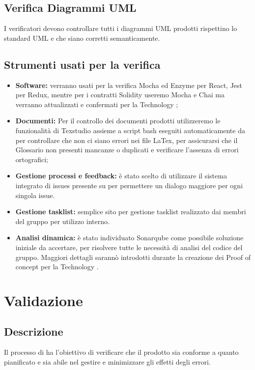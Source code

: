 \documentclass[NormeDiProgetto.tex]{subfiles}
\begin{document}
	\subsection{Verifica Diagrammi UML}
	I verificatori devono controllare tutti i diagrammi UML prodotti rispettino lo standard UML e che siano corretti semanticamente.
	
	\subsection{Strumenti usati per la verifica}
	\begin{itemize}
		\item \textbf{Software:} verranno usati per la verifica Mocha ed Enzyme per React, Jest per Redux, mentre per i contratti Solidity useremo Mocha e Chai ma verranno attualizzati e confermati per la Technology ;
		\item \textbf{Documenti:} Per il controllo dei documenti prodotti utilizzeremo le funzionalità di Texstudio assieme a script bash eseguiti automaticamente da  per controllare che non ci siano errori nei file LaTex, per assicurarsi che il Glossario non presenti mancanze o duplicati e verificare l'assenza di errori ortografici;
		\item \textbf{Gestione processi e feedback:} è stato scelto di utilizzare il sistema integrato di issues presente su  per permettere un dialogo maggiore per ogni singola issue. 
		\item \textbf{Gestione tasklist:}  semplice sito per gestione tasklist realizzato dai membri del gruppo per utilizzo interno.
		\item \textbf{Analisi dinamica:} è stato individuato Sonarqube come possibile soluzione iniziale da accertare, per risolvere tutte le necessità di analisi del codice del gruppo. Maggiori dettagli sarannò introdotti durante la creazione dei Proof of concept per la Technology .
	\end{itemize}


	\section{Validazione}
	\subsection{Descrizione}
		Il processo di  ha l'obiettivo di verificare che il prodotto sia conforme a quanto pianificato e sia abile nel gestire e minimizzare gli effetti degli errori.
\end{document}
